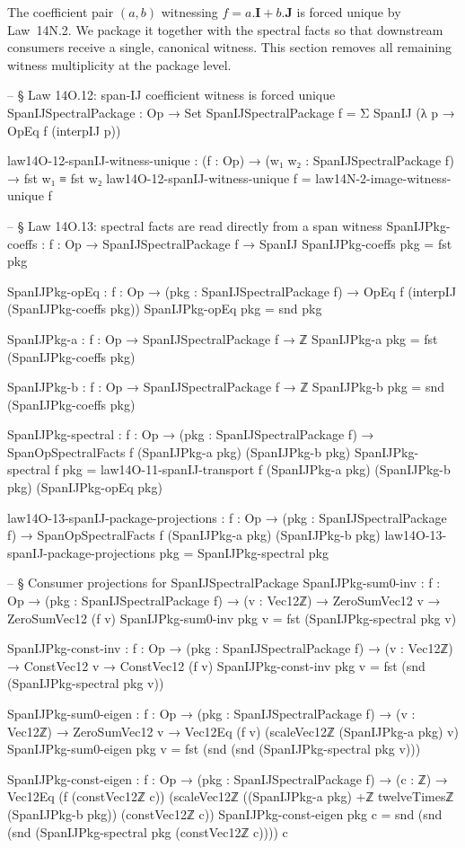 \documentclass[11pt,a4paper]{book}
\def\cdot{.}%
\begin{document}
The coefficient pair $(a,b)$ witnessing $f = a\!\cdot\!\mathbf{I}+b\!\cdot\!\mathbf{J}$
is forced unique by Law~14N.2.
We package it together with the spectral facts so that
downstream consumers receive a single, canonical witness.  This section removes
all remaining witness multiplicity at the package level.

\begin{code}
-- § Law 14O.12: span-IJ coefficient witness is forced unique
SpanIJSpectralPackage : Op → Set
SpanIJSpectralPackage f = Σ SpanIJ (λ p → OpEq f (interpIJ p))

law14O-12-spanIJ-witness-unique : (f : Op) → (w₁ w₂ : SpanIJSpectralPackage f) → fst w₁ ≡ fst w₂
law14O-12-spanIJ-witness-unique f = law14N-2-image-witness-unique f

-- § Law 14O.13: spectral facts are read directly from a span witness
SpanIJPkg-coeffs : {f : Op} → SpanIJSpectralPackage f → SpanIJ
SpanIJPkg-coeffs pkg = fst pkg

SpanIJPkg-opEq : {f : Op} → (pkg : SpanIJSpectralPackage f) → OpEq f (interpIJ (SpanIJPkg-coeffs pkg))
SpanIJPkg-opEq pkg = snd pkg

SpanIJPkg-a : {f : Op} → SpanIJSpectralPackage f → ℤ
SpanIJPkg-a pkg = fst (SpanIJPkg-coeffs pkg)

SpanIJPkg-b : {f : Op} → SpanIJSpectralPackage f → ℤ
SpanIJPkg-b pkg = snd (SpanIJPkg-coeffs pkg)

SpanIJPkg-spectral : {f : Op} → (pkg : SpanIJSpectralPackage f) → SpanOpSpectralFacts f (SpanIJPkg-a pkg) (SpanIJPkg-b pkg)
SpanIJPkg-spectral {f} pkg =
  law14O-11-spanIJ-transport f (SpanIJPkg-a pkg) (SpanIJPkg-b pkg) (SpanIJPkg-opEq pkg)

law14O-13-spanIJ-package-projections : {f : Op} → (pkg : SpanIJSpectralPackage f) → SpanOpSpectralFacts f (SpanIJPkg-a pkg) (SpanIJPkg-b pkg)
law14O-13-spanIJ-package-projections pkg = SpanIJPkg-spectral pkg

-- § Consumer projections for SpanIJSpectralPackage
SpanIJPkg-sum0-inv : {f : Op} → (pkg : SpanIJSpectralPackage f) → (v : Vec12ℤ) → ZeroSumVec12 v → ZeroSumVec12 (f v)
SpanIJPkg-sum0-inv pkg v = fst (SpanIJPkg-spectral pkg v)

SpanIJPkg-const-inv : {f : Op} → (pkg : SpanIJSpectralPackage f) → (v : Vec12ℤ) → ConstVec12 v → ConstVec12 (f v)
SpanIJPkg-const-inv pkg v = fst (snd (SpanIJPkg-spectral pkg v))

SpanIJPkg-sum0-eigen : {f : Op} → (pkg : SpanIJSpectralPackage f) → (v : Vec12ℤ) → ZeroSumVec12 v → Vec12Eq (f v) (scaleVec12ℤ (SpanIJPkg-a pkg) v)
SpanIJPkg-sum0-eigen pkg v = fst (snd (snd (SpanIJPkg-spectral pkg v)))

SpanIJPkg-const-eigen : {f : Op} → (pkg : SpanIJSpectralPackage f) → (c : ℤ) →
  Vec12Eq (f (constVec12ℤ c))
         (scaleVec12ℤ ((SpanIJPkg-a pkg) +ℤ twelveTimesℤ (SpanIJPkg-b pkg)) (constVec12ℤ c))
SpanIJPkg-const-eigen pkg c = snd (snd (snd (SpanIJPkg-spectral pkg (constVec12ℤ c)))) c
\end{code}
\end{document}
